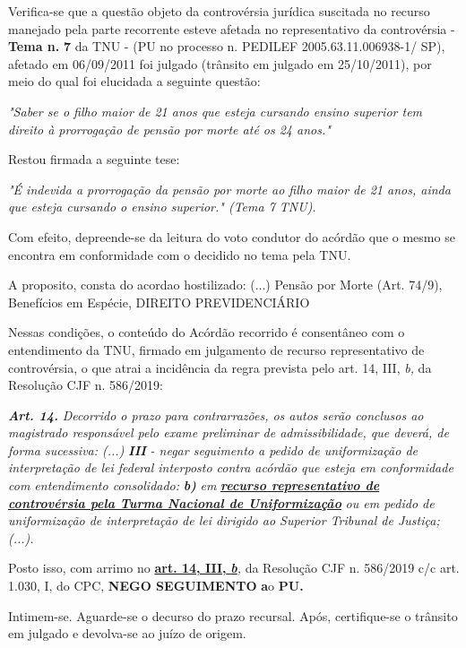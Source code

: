 \documentclass[12pt]{article}
\begin{document}
\justifying
\noindent Verifica-se que a questão objeto da controvérsia jurídica suscitada no recurso manejado pela parte recorrente esteve afetada no representativo da controvérsia - \textbf{Tema n. }\textbf{7} da TNU - (PU no processo n. PEDILEF 2005.63.11.006938-1/ SP),  afetado em 06/09/2011 foi julgado (trânsito em julgado em 25/10/2011), por meio do qual foi elucidada a seguinte questão:

\noindent \textit{"Saber se o filho maior de 21 anos que esteja cursando ensino superior tem direito à prorrogação de pensão por morte até os 24 anos."}

\noindent Restou firmada a seguinte tese:

\noindent \textit{"É indevida a prorrogação da pensão por morte ao filho maior de 21 anos, ainda que esteja cursando o ensino superior." (Tema 7 TNU).}

\noindent Com efeito, depreende-se da leitura do voto condutor do acórdão que o mesmo se encontra em conformidade com o decidido no  tema pela TNU.

\noindent A proposito, consta do acordao hostilizado: (...) Pensão por Morte (Art. 74/9), Benefícios em Espécie, DIREITO PREVIDENCIÁRIO

\noindent Nessas condições, o conteúdo do Acórdão recorrido é consentâneo com o entendimento da TNU, firmado em julgamento de recurso representativo de controvérsia, o que atrai a incidência da regra prevista pelo art. 14, III, \textit{b,} da Resolução CJF n. 586/2019:

\noindent \textit{\textbf{Art. 14.}}\textit{ Decorrido o prazo para contrarrazões, os autos serão conclusos ao magistrado responsável pelo exame preliminar de admissibilidade, que deverá, de forma sucessiva: (...) }\textit{\textbf{III }}\textit{- negar seguimento a pedido de uniformização de interpretação de lei federal interposto contra acórdão que esteja em conformidade com entendimento consolidado: }\textit{\textbf{b)}}\textit{ em }\uline{\textit{\textbf{recurso representativo de controvérsia pela Turma Nacional de Uniformização}}}\textit{ ou em pedido de uniformização de interpretação de lei dirigido ao Superior Tribunal de Justiça;(...).}

\noindent Posto isso, com arrimo no \uline{\textbf{art. 14, III, }}\uline{\textit{\textbf{b}}}\textit{,} da Resolução CJF n. 586/2019 c/c art. 1.030, I, do CPC, \textbf{NEGO SEGUIMENTO }\textbf{a}o\textbf{ PU}\textbf{.}

\noindent Intimem-se. Aguarde-se o decurso do prazo recursal. Após, certifique-se o trânsito em julgado e devolva-se ao juízo de origem.
\end{document}

